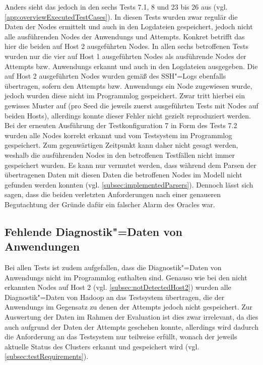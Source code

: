 Anders sieht das jedoch in den sechs \glspl{Test} 7.1, 8 und 23 bis 26 aus (vgl. \cref{app:overviewExecutedTestCases}).
In diesen \glspl{Test} wurden zwar regulär die Daten der Nodes ermittelt und auch in den Logdateien gespeichert, jedoch nicht alle ausführenden Nodes der \glspl{Anwendung} und Attempts.
Konkret betrifft das hier die beiden auf Host 2 ausgeführten Nodes.
In allen sechs betroffenen \glspl{Test} wurden nur die vier auf Host 1 ausgeführten Nodes als ausführende Nodes der \glspl{Attempt} bzw. \glspl{Anwendung} erkannt und auch in den Logdateien ausgegeben.
Die auf Host 2 ausgeführten Nodes wurden gemäß des SSH"=Logs ebenfalls übertragen, sofern den \glspl{Attempt} bzw. \glspl{Anwendung} ein Node zugewiesen wurde, jedoch wurden diese nicht im Programmlog gespeichert.
Zwar tritt hierbei ein gewisses Muster auf (pro Seed die jeweils zuerst ausgeführten \glspl{Test} mit Nodes auf beiden Hosts), allerdings konnte dieser Fehler nicht gezielt reproduziert werden.
Bei der erneuten Ausführung der \gls{Testkonfiguration} 7 in Form des Tests 7.2 wurden alle Nodes korrekt erkannt und vom Testsystem im Programmlog gespeichert.
Zum gegenwärtigen Zeitpunkt kann daher nicht gesagt werden, weshalb die ausführenden Nodes in den betroffenen Testfällen nicht immer gespeichert wurden.
Es kann nur vermutet werden, dass während dem Parsen der übertragenen Daten mit diesen Daten die betroffenen Nodes im Modell nicht gefunden werden konnten (vgl. \cref{subsec:implementedParsers}).
Dennoch lässt sich sagen, dass die beiden verletzten Anforderungen nach einer genaueren Begutachtung der Gründe dafür ein falscher Alarm des Oracles war.

\subsection{Fehlende Diagnostik"=Daten von Anwendungen}
\label{subsec:notSavedAppDiagnostics}

Bei allen \glspl{Test} ist zudem aufgefallen, dass die Diagnostik"=Daten von \glspl{Anwendung} nicht im Programmlog enthalten sind.
Genauso wie bei den nicht erkannten Nodes auf Host 2 (vgl. \cref{subsec:notDetectedHost2}) wurden alle Diagnostik"=Daten von Hadoop an das Testsystem übertragen, die der \glspl{Anwendung} im Gegensatz zu denen der \glspl{Attempt} jedoch nicht gespeichert.
Zur Auswertung der Daten im Rahmen der Evaluation ist dies zwar irrelevant, da dies auch aufgrund der Daten der \glspl{Attempt} geschehen konnte, allerdings wird dadurch die Anforderung an das Testsystem nur teilweise erfüllt, wonach der jeweils aktuelle Status des Clusters erkannt und gespeichert wird (vgl. \cref{subsec:testRequirements}).

